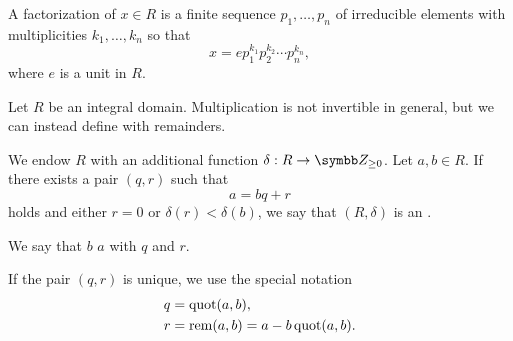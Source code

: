 \begin{definition}\label{def:factorization_in_ring}
  A factorization of \( x \in R \) is a finite sequence \( p_1, \ldots, p_n \) of irreducible elements with multiplicities \( k_1, \ldots, k_n \) so that
  \begin{equation*}
    x = e p_1^{k_1} p_2^{k_2} \cdots p_n^{k_n},
  \end{equation*}
  where \( e \) is a unit in \( R \).
\end{definition}

\begin{definition}\label{def:euclidean_domain}\cite{nLab:euclidean_domain}
  Let \( R \) be an integral domain. Multiplication is not invertible in general, but we can instead define  with remainders.

  We endow \( R \) with an additional function \( \delta: R \to \Z_{\geq 0} \). Let \( a, b \in R \). If there exists a pair \( (q, r) \) such that
  \begin{equation*}
    a = bq + r
  \end{equation*}
  holds and either \( r = 0 \) or \( \delta(r) < \delta(b) \), we say that \( (R, \delta) \) is an .

  We say that \( b \)  \( a \) with  \( q \) and  \( r \).

  If the pair \( (q, r) \) is unique, we use the special notation
  \begin{align*}
    q &= \operatorname{quot}(a, b), \\
    r &= \operatorname{rem}(a, b) = a - b \operatorname{quot}(a, b).
  \end{align*}
\end{definition}

